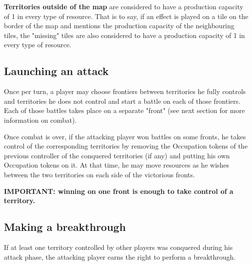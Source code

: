 \documentclass[a4paper]{article}
\begin{document}
      \textbf{Territories outside of the map} are considered to have a
      production capacity of 1 in every type of resource.
      That is to say, if an effect is played on a tile on the border
      of the map and mentions the production capacity of the neighbouring tiles,
      the "missing" tiles are also considered to have a production capacity of
      1 in every type of resource.


\newpage
\subsection{Launching an attack}

    Once per turn, a player may choose frontiers between territories he fully controls
    and territories he does not control and start a battle on each of those frontiers.
    Each of those battles takes place on a separate "front"
    (see next section for more information on combat).

    Once combat is over, if the attacking player won battles on some fronts,
    he takes control of the corresponding territories by removing the Occupation tokens of
    the previous controller of the conquered territories (if any) and putting his own
    Occupation tokens on it.
    At that time, he may move resources as he wishes between the two territories on each
    side of the victorious fronts.
    
    \hspace{-2em} \textbf{
    IMPORTANT: winning on one front is enough to take control of a territory.
    }


\subsection{Making a breakthrough}

    If at least one territory controlled by other players was conquered during his attack
    phase, the attacking player earns the right to perform a breakthrough.
\end{document}

